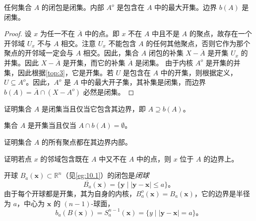 \begin{theorem}\label{thm:10.2} 
	任何集合 $A$ 的闭包是闭集。内部 $A^{o}$ 是包含在 $A$ 中的最大开集。边界 $b(A)$ 是闭集。
\begin{theorem}

\begin{proof}
	设 $x$ 为任一不在 $\overline{A}$ 中的点。即 $x$ 不在 $A$ 中且不是 $A$ 的聚点，故存在一个开邻域 $U_{x}$ 不与 $A$ 相交。注意 $U_{x}$ 不能包含 $A$ 的任何其他聚点，否则它作为那个聚点的开邻域一定会与 $A$ 相交。因此，集合 $A$ 闭包的补集 $X-\overline{A}$ 是开集 $U_{x}$ 的并集。因此 $X-\overline{A}$ 是开集，而它的补集 $\overline{A}$ 是闭集。
	由于内核 $A^{o}$ 是开集的并集，因此根据\ref{top:3}，它是开集。若 $U$ 是包含在 $A$ 中的开集，则根据定义，$U\subseteq A^{o}$。因此，$A^{o}$ 是 $A$ 中的最大开子集，其补集是闭集，而边界 $b(A)=\overline{A} \cap \left( X-A^{o}\right)$ 必然是闭集。
\end{proof}

\begin{exercise}
	证明集合 $A$ 是闭集当且仅当它包含其边界，即 $A\supseteq b(A)$。
\end{exercise}

\begin{exercise}
	集合 $A$ 是开集当且仅当 $A\cap b(A)=\emptyset $。
\end{exercise}

\begin{exercise}
	证明集合 $A$ 的所有聚点都在其边界内部。
\end{exercise} 

\begin{exercise}
	证明若点 $x$ 的邻域包含既在 $A$ 中又不在 $A$ 中的点，则 $x$ 位于 $A$ 的边界上。
\end{exercise}

\begin{eg}\label{eg:10.5}
	开球 $B_{a} (\mathbf{x} )\subset \mathbb{R}^{n}$（见\ref{eg:10.1}）的闭包是\emph{闭球}
\begin{equation*}
\overline{B_{a}} (\mathbf{x} )=\{\mathbf{y} \mid | \mathbf{y} -\mathbf{x}| \leq a\}。
\end{equation*}
由于每个开球都是开集，其为自身的内核，$B_{a}^{o} (\mathbf{x} )=B_{a} (\mathbf{x} )$，它的边界是半径为 $a$，中心为 $\mathbf{x}$ 的 $(n-1)$-球面，
\begin{equation*}
b_{a} (B(\mathbf{x} ))=S_{a}^{n-1} (\mathbf{x} )=\{y\mid | \mathbf{y} -\mathbf{x}| =a\}。
\end{equation*}
\end{eg}


\end{theorem}
\end{theorem}
